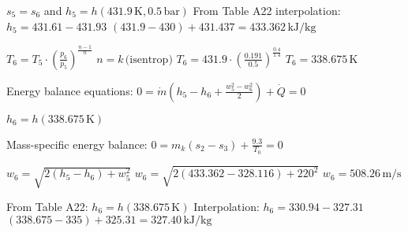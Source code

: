 \( s_5 = s_6 \) and  
\( h_5 = h(431.9 \, \text{K}, 0.5 \, \text{bar}) \)  
From Table A22 interpolation:  
\( h_5 = 431.61 - 431.93 \)  
\( (431.9 - 430) + 431.437 = 433.362 \, \text{kJ/kg} \)  

\( T_6 = T_5 \cdot \left( \frac{p_6}{p_5} \right)^{\frac{n-1}{n}} \)  
\( n = k \, \text{(isentrop)} \)  
\( T_6 = 431.9 \cdot \left( \frac{0.191}{0.5} \right)^{\frac{0.4}{1.4}} \)  
\( T_6 = 338.675 \, \text{K} \)  

Energy balance equations:  
\( 0 = \dot{m} (h_5 - h_6 + \frac{w_5^2 - w_6^2}{2}) + \dot{Q} = 0 \)  

\( h_6 = h(338.675 \, \text{K}) \)  

Mass-specific energy balance:  
\( 0 = m_k (s_2 - s_3) + \frac{9.3}{T_0} = 0 \)  

\( w_6 = \sqrt{2(h_5 - h_6) + w_5^2} \)  
\( w_6 = \sqrt{2(433.362 - 328.116) + 220^2} \)  
\( w_6 = 508.26 \, \text{m/s} \)  

From Table A22:  
\( h_6 = h(338.675 \, \text{K}) \)  
Interpolation:  
\( h_6 = 330.94 - 327.31 \)  
\( (338.675 - 335) + 325.31 = 327.40 \, \text{kJ/kg} \)